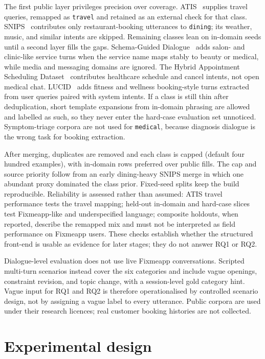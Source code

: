 The first public layer privileges precision over coverage.
ATIS~\cite{hemphill-etal-1990-atis} supplies travel queries, remapped as \texttt{travel} and retained as an external check for that class.
SNIPS~\cite{coucke_snips_2018} contributes only restaurant-booking utterances to \texttt{dining}; its weather, music, and similar intents are skipped.
Remaining classes lean on in-domain seeds until a second layer fills the gaps.
Schema-Guided Dialogue~\cite{rastogi_sgd_2020} adds salon- and clinic-like service turns when the service name maps stably to beauty or medical, while media and messaging domains are ignored.
The Hybrid Appointment Scheduling Dataset~\cite{hasd_hf} contributes healthcare schedule and cancel intents, not open medical chat.
LUCID~\cite{stacey_lucid_2024} adds fitness and wellness booking-style turns extracted from user queries paired with system intents.
If a class is still thin after deduplication, short template expansions from in-domain phrasing are allowed and labelled as such, so they never enter the hard-case evaluation set unnoticed.
Symptom-triage corpora are not used for \texttt{medical}, because diagnosis dialogue is the wrong task for booking extraction.

After merging, duplicates are removed and each class is capped (default four hundred examples), with in-domain rows preferred over public fills.
The cap and source priority follow from an early dining-heavy SNIPS merge in which one abundant proxy dominated the class prior.
Fixed-seed splits keep the build reproducible.
Reliability is assessed rather than assumed: ATIS travel performance tests the travel mapping; held-out in-domain and hard-case slices test Fixmeapp-like and underspecified language; composite holdouts, when reported, describe the remapped mix and must not be interpreted as field performance on Fixmeapp users.
These checks establish whether the structured front-end is usable as evidence for later stages; they do not answer RQ1 or RQ2.

Dialogue-level evaluation does not use live Fixmeapp conversations.
Scripted multi-turn scenarios instead cover the six categories and include vague openings, constraint revision, and topic change, with a session-level gold category hint.
Vague input for RQ1 and RQ2 is therefore operationalised by controlled scenario design, not by assigning a vague label to every utterance.
Public corpora are used under their research licences; real customer booking histories are not collected.

\section{Experimental design}
\label{sec:method-experimental}

